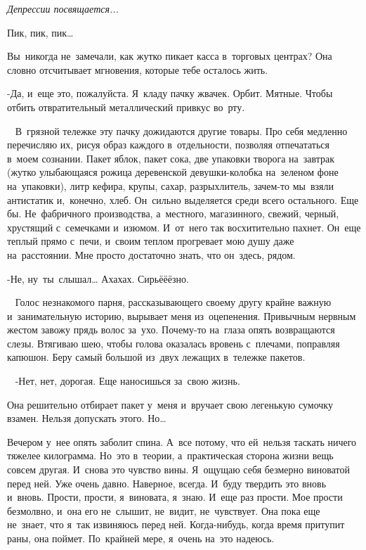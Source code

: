 \begin{flushright}
	\textit{Депрессии посвящается...}
\end{flushright}
Пик, пик, пик…
 
Вы~никогда не~замечали, как жутко пикает касса в~торговых центрах? Она словно отсчитывает мгновения, которые тебе осталось жить.
 
-Да, и~еще это, пожалуйста.
Я~кладу пачку жвачек.
Орбит.
Мятные.
Чтобы отбить отвратительный металлический привкус во~рту.

~
В~грязной тележке эту пачку дожидаются другие товары.
Про себя медленно перечисляю их, рисуя образ каждого в~отдельности, позволяя отпечататься в~моем сознании.
Пакет яблок, пакет сока, две упаковки творога на~завтрак (жутко улыбающаяся рожица деревенской девушки-колобка на~зеленом фоне на~упаковки), литр кефира, крупы, сахар, разрыхлитель, зачем-то мы~взяли антистатик и,~конечно, хлеб.
Он~сильно выделяется среди всего остального.
Еще бы.
Не~фабричного производства, а~местного, магазинного, свежий, черный, хрустящий с~семечками и~изюмом.
И~от~него так восхитительно пахнет.
Он~еще теплый прямо с~печи, и~своим теплом прогревает мою душу даже на~расстоянии.
Мне просто достаточно знать, что он~здесь, рядом.
 
-Не, ну~ты~слышал… Ахахах.
Сирьёёёзно.

~
Голос незнакомого парня, рассказывающего своему другу крайне важную и~занимательную историю, вырывает меня из~оцепенения.
Привычным нервным жестом завожу прядь волос за~ухо.
Почему-то на~глаза опять возвращаются слезы.
Втягиваю шею, чтобы голова оказалась вровень с~плечами, поправляя капюшон.
Беру самый большой из~двух лежащих в~тележке пакетов.

~
-Нет, нет, дорогая.
Еще наносишься за~свою жизнь.
 
Она решительно отбирает пакет у~меня и~вручает свою легенькую сумочку взамен.
Нельзя допускать этого.
Но…
 
Вечером у~нее опять заболит спина.
А~все потому, что ей~нельзя таскать ничего тяжелее килограмма.
Но~это в~теории, а~практическая сторона жизни вещь совсем другая.
И~снова это чувство вины.
Я~ощущаю себя безмерно виноватой перед ней.
Уже очень давно.
Наверное, всегда.
И~буду твердить это вновь и~вновь.
Прости, прости, я~виновата, я~знаю.
И~еще раз прости.
Мое прости безмолвно, и~она его не~слышит, не~видит, не~чувствует.
Она пока еще не~знает, что я~так извиняюсь перед ней.
Когда-нибудь, когда время притупит раны, она поймет.
По~крайней мере, я~очень на~это надеюсь.
 
